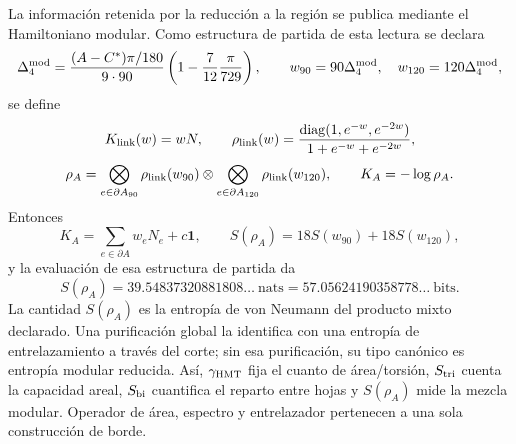 La información retenida por la reducción a la región se publica mediante el
Hamiltoniano modular. Como estructura de partida de esta lectura se declara
\[
 \Delta_4^{\rm mod}
 =\frac{(A-C^*)\pi/180}{9\cdot90}
 \left(1-\frac7{12}\frac\pi{729}\right),
 \qquad w_{90}=90\Delta_4^{\rm mod},\quad
 w_{120}=120\Delta_4^{\rm mod},
\]
se define
\[
 K_{\rm link}(w)=wN,
 \qquad
 \rho_{\rm link}(w)=
 \frac{\operatorname{diag}(1,e^{-w},e^{-2w})}
 {1+e^{-w}+e^{-2w}},
\]
\begin{equation}
 \rho_A=
 \bigotimes_{e\in\partial A_{90}}\rho_{\rm link}(w_{90})
 \otimes
 \bigotimes_{e\in\partial A_{120}}\rho_{\rm link}(w_{120}),
 \qquad K_A=-\log\rho_A.
 \label{hap:eq:estado-hamiltoniano-modular-barbero-rev11}
\end{equation}
Entonces
\[
 K_A=\sum_{e\in\partial A}w_eN_e+c\mathbf1,
 \qquad
 S(\rho_A)=18S(w_{90})+18S(w_{120}),
\]
y la evaluación de esa estructura de partida da
\[
 S(\rho_A)=39.54837320881808\ldots\ \text{nats}
 =57.05624190358778\ldots\ \text{bits}.
\]
\enlargethispage{6\baselineskip}
La cantidad \(S(\rho_A)\) es la entropía de von Neumann del producto mixto
declarado. Una purificación global la identifica con una entropía de
entrelazamiento a través del corte; sin esa purificación, su tipo canónico es
entropía modular reducida. Así, \(\gamma_{\rm HMT}\) fija el cuanto de
área/torsión, \(S_{\rm tri}\) cuenta la capacidad areal, \(S_{\rm bi}\)
cuantifica el reparto entre hojas y \(S(\rho_A)\) mide la mezcla modular.
Operador de área, espectro y entrelazador pertenecen a una sola construcción
de borde.
